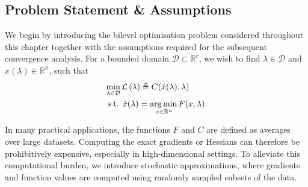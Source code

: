 \documentclass[11pt, twoside]{report}
\begin{document}
\subsection{Problem Statement \& Assumptions}
We begin by introducing the bilevel optimisation problem considered throughout this chapter together with the assumptions required for the subsequent convergence analysis. For a bounded domain $\mathcal D \subset \mathbb{R}^r$, we wish to find $\lambda \in \mathcal{D}$ and $\hat{x}(\lambda) \in \mathbb{R}^n$, such that
\begin{align} 
&\min_{\lambda \in \mathcal{D}} \mathcal{L}\left(\lambda \right) \triangleq C(\hat{x}(\lambda), \lambda) \label{outer_hoag_neu}\\
&\text { s.t. } \hat{x}(\lambda) =\underset{x \in \mathbb{R}^{n}} {\operatorname*{arg\, min \,}} {F(x, \lambda)}. \label{inner_hoag_neu}
\end{align}

In many practical applications, the functions $F$ and $C$ are defined as averages over large datasets. 
Computing the exact gradients or Hessians can therefore be prohibitively expensive, especially in high-dimensional settings. 
To alleviate this computational burden, we introduce stochastic approximations, where gradients and function values are computed using randomly sampled subsets of the data. 
\end{document}
